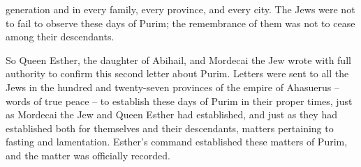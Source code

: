 {generation
and in every family,
every
province,
and every city.
The Jews
were not to fail
to observe
these
days
of Purim;
the remembrance
of them was not to cease
among
their descendants.
\par }{\PP {}So Queen
Esther,
the daughter
of Abihail,
and Mordecai
the Jew
wrote
with
full
authority
to confirm
this
second
letter
about Purim.
Letters
were sent
to
all
the Jews
in the hundred
and twenty-seven
provinces
of the empire
of Ahasuerus
– words
of true
peace –
to establish
these
days
of Purim
in their proper times,
just
as Mordecai
the Jew
and Queen
Esther
had
established,
and just as
they had
established both for themselves
and their descendants,
matters
pertaining to fasting
and lamentation.
Esther’s
command
established
these matters
of Purim,
and the matter
was officially
recorded.

\par }